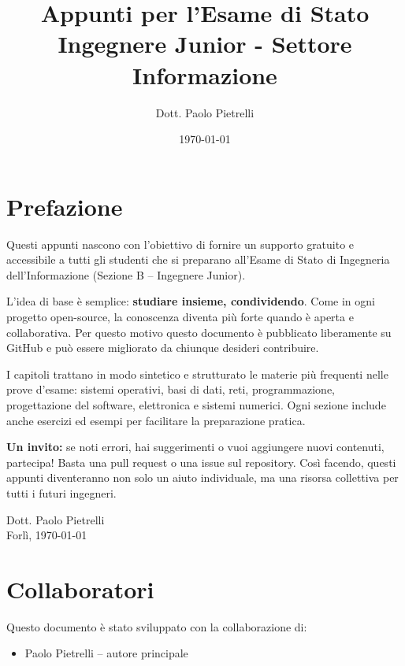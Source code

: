 \documentclass[a4paper,12pt,openright,twoside]{book}
\title{Appunti per l'Esame di Stato\\Ingegnere Junior - Settore Informazione}
\author{Dott. Paolo Pietrelli}
\date{\today}
\begin{document}
\FrontCoverPage

\frontmatter

\cleardoublepage
\maketitle
\cleardoublepage

\cleardoublepage
\chapter*{Prefazione}

Questi appunti nascono con l’obiettivo di fornire un supporto
gratuito e accessibile a tutti gli studenti che si preparano
all’Esame di Stato di Ingegneria dell’Informazione (Sezione B – Ingegnere Junior).

L’idea di base è semplice: \textbf{studiare insieme, condividendo}.
Come in ogni progetto open-source, la conoscenza diventa più
forte quando è aperta e collaborativa. Per questo motivo
questo documento è pubblicato liberamente su GitHub e può
essere migliorato da chiunque desideri contribuire.

I capitoli trattano in modo sintetico e strutturato le materie
più frequenti nelle prove d’esame: sistemi operativi, basi di dati,
reti, programmazione, progettazione del software, elettronica e
sistemi numerici. Ogni sezione include anche esercizi ed esempi
per facilitare la preparazione pratica.

\medskip
\noindent
\textbf{Un invito:} se noti errori, hai suggerimenti o vuoi aggiungere
nuovi contenuti, partecipa! Basta una pull request o una issue sul repository.
Così facendo, questi appunti diventeranno non solo un aiuto individuale,
ma una risorsa collettiva per tutti i futuri ingegneri.

\bigskip
\begin{flushright}
Dott. Paolo Pietrelli \\
Forlì, \today
\end{flushright}

\cleardoublepage
\chapter*{Collaboratori}
Questo documento è stato sviluppato con la collaborazione di:
\begin{itemize}
  \item Paolo Pietrelli – autore principale
\end{itemize}
\end{document}
